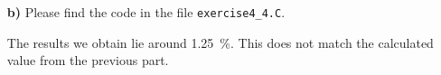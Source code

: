 \documentclass[10pt]{article}
\newenvironment{myfont}{\fontfamily{put}\selectfont}{\par}
\begin{document}
\begin{myfont}
\begin{itemize}
    \noindent This results in

    \begin{equation}
      p = \frac{O_{\textrm{segment}}}{O_{\textrm{sphere}}} = \frac{2\pi \cdot \left(a^{2} + (r-h)^{2}\right) \cdot \left(1 - \frac{1}{\sqrt{\left(\frac{a}{r-h}\right)^{2} + 1}} \right)}{4\pi \cdot \left(a^{2} + (r-h)^{2}\right)} = \frac{1}{2} - \frac{1}{2\sqrt{\left(\frac{a}{r-h}\right)^{2} + 1}}
    \end{equation}

    \noindent Using $a =$ \SI{0.02}{\metre} and $r-h =$ \SI{0.10}{\metre} yields $p =$ \SI{0.971}{\percent}.



  \item[\textbf{b)}] Please find the code in the file \texttt{exercise4\_4.C}.

    \noindent The results we obtain lie around \SI{1.25}{\percent}.
    This does not match the calculated value from the previous part.    

\end{itemize}


\end{myfont}
\end{document}
